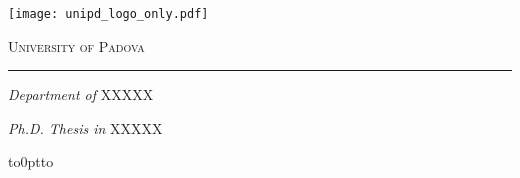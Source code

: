 \begin{titlepage}
  \makeatletter
  \begin{center}
  \vspace*{-1cm}
    \begin{center}
      \texttt{[image: unipd\_logo\_only.pdf]}
    \end{center}
  	\begin{Huge}
     \textcolor{UNIPDRED}{\textsc{University of Padova}}
    \end{Huge}
    \noindent\rule{\textwidth}{0.5pt}
    \begin{large}
      \textit{Department of } \textsc{XXXXX}\\[0.05cm]
    \end{large}
    \begin{normalsize}
      \textit{Ph.D. Thesis in } \textsc{XXXXX}\\[1.2cm]
    \end{normalsize}
    
    \vspace{4cm}


    \vspace*{-5.5cm}  
    \vbox to0pt{\vbox to\vss}
    \vspace*{5cm}
    \begin{Huge}
      \@title\\
      \end{Huge}  
    \end{center}


\end{titlepage}
